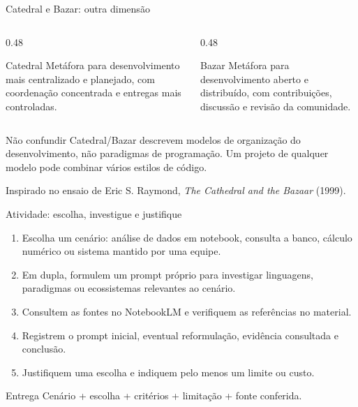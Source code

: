 \documentclass[aspectratio=169,10pt]{beamer}
\begin{document}
\begin{frame}{Catedral e Bazar: outra dimensão}
  \begin{columns}[T,onlytextwidth]
    \begin{column}{0.48\textwidth}
      \begin{block}{Catedral}
        Metáfora para desenvolvimento mais centralizado e planejado, com coordenação concentrada e entregas mais controladas.
      \end{block}
    \end{column}
    \begin{column}{0.48\textwidth}
      \begin{exampleblock}{Bazar}
        Metáfora para desenvolvimento aberto e distribuído, com contribuições, discussão e revisão da comunidade.
      \end{exampleblock}
    \end{column}
  \end{columns}
  \begin{alertblock}{Não confundir}
    Catedral/Bazar descrevem modelos de organização do desenvolvimento, não paradigmas de programação. Um projeto de qualquer modelo pode combinar vários estilos de código.
  \end{alertblock}
  \footnotesize Inspirado no ensaio de Eric S. Raymond, \textit{The Cathedral and the Bazaar} (1999).
\end{frame}

\begin{frame}{Atividade: escolha, investigue e justifique}
  \begin{enumerate}
    \item Escolha um cenário: análise de dados em notebook, consulta a banco, cálculo numérico ou sistema mantido por uma equipe.
    \item Em dupla, formulem um prompt próprio para investigar linguagens, paradigmas ou ecossistemas relevantes ao cenário.
    \item Consultem as fontes no NotebookLM e verifiquem as referências no material.
    \item Registrem o prompt inicial, eventual reformulação, evidência consultada e conclusão.
    \item Justifiquem uma escolha e indiquem pelo menos um limite ou custo.
  \end{enumerate}
  \begin{exampleblock}{Entrega}
    Cenário + escolha + critérios + limitação + fonte conferida.
  \end{exampleblock}
\end{frame}
\end{document}
